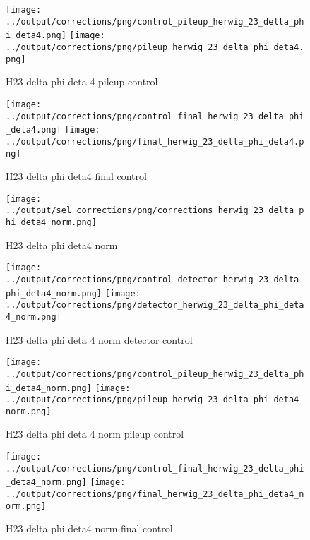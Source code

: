 \documentclass[11pt]{book}
\begin{document}
\begin{figure}[ht]
\centering
\texttt{[image: ../output/corrections/png/control\_pileup\_herwig\_23\_delta\_phi\_deta4.png]}
\texttt{[image: ../output/corrections/png/pileup\_herwig\_23\_delta\_phi\_deta4.png]}
\caption{H23 delta phi deta 4 pileup control}
\label{fig:H23_delta_phi_deta4_pileup_control}
\end{figure}


\begin{figure}[ht]
\centering
\texttt{[image: ../output/corrections/png/control\_final\_herwig\_23\_delta\_phi\_deta4.png]}
\texttt{[image: ../output/corrections/png/final\_herwig\_23\_delta\_phi\_deta4.png]}
\caption{H23 delta phi deta4 final control}
\label{fig:H23_delta_phi_deta4_final_control}
\end{figure}


\begin{figure}[ht]
\centering
\texttt{[image: ../output/sel\_corrections/png/corrections\_herwig\_23\_delta\_phi\_deta4\_norm.png]}
\caption{H23 delta phi deta4 norm}
\label{fig:H23_delta_phi_deta4_norm}
\end{figure}

\begin{figure}[ht]
\centering
\texttt{[image: ../output/corrections/png/control\_detector\_herwig\_23\_delta\_phi\_deta4\_norm.png]}
\texttt{[image: ../output/corrections/png/detector\_herwig\_23\_delta\_phi\_deta4\_norm.png]}
\caption{H23 delta phi deta 4 norm detector control}
\label{fig:H23_delta_phi_deta4_norm_detector_control}
\end{figure}

\begin{figure}[ht]
\centering
\texttt{[image: ../output/corrections/png/control\_pileup\_herwig\_23\_delta\_phi\_deta4\_norm.png]}
\texttt{[image: ../output/corrections/png/pileup\_herwig\_23\_delta\_phi\_deta4\_norm.png]}
\caption{H23 delta phi deta 4 norm pileup control}
\label{fig:H23_delta_phi_deta4_norm_pileup_control}
\end{figure}


\begin{figure}[ht]
\centering
\texttt{[image: ../output/corrections/png/control\_final\_herwig\_23\_delta\_phi\_deta4\_norm.png]}
\texttt{[image: ../output/corrections/png/final\_herwig\_23\_delta\_phi\_deta4\_norm.png]}
\caption{H23 delta phi deta4 norm final control}
\label{fig:H23_delta_phi_deta4_norm_final_control}
\end{figure}
\end{document}
